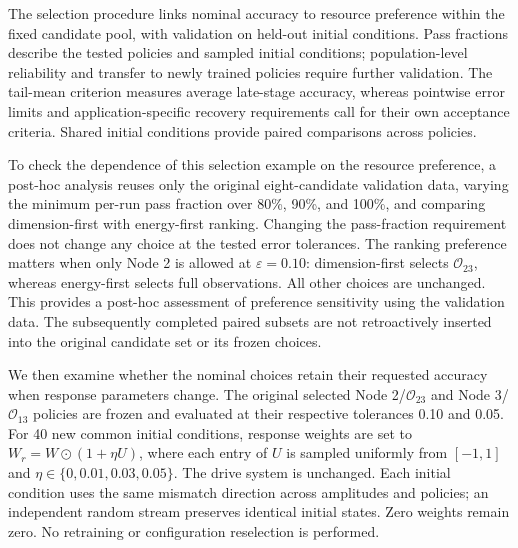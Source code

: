 \documentclass[a4paper,fleqn]{cas-sc}
\theoremstyle{plain}
\theoremstyle{definition}
\begin{document}
The selection procedure links nominal accuracy to resource preference within the fixed candidate pool, with validation on held-out initial conditions. Pass fractions describe the tested policies and sampled initial conditions; population-level reliability and transfer to newly trained policies require further validation. The tail-mean criterion measures average late-stage accuracy, whereas pointwise error limits and application-specific recovery requirements call for their own acceptance criteria. Shared initial conditions provide paired comparisons across policies.

To check the dependence of this selection example on the resource preference, a post-hoc analysis reuses only the original eight-candidate validation data, varying the minimum per-run pass fraction over 80\%, 90\%, and 100\%, and comparing dimension-first with energy-first ranking. Changing the pass-fraction requirement does not change any choice at the tested error tolerances. The ranking preference matters when only Node 2 is allowed at $\varepsilon=0.10$: dimension-first selects $\mathcal O_{23}$, whereas energy-first selects full observations. All other choices are unchanged. This provides a post-hoc assessment of preference sensitivity using the validation data. The subsequently completed paired subsets are not retroactively inserted into the original candidate set or its frozen choices.

We then examine whether the nominal choices retain their requested accuracy when response parameters change. The original selected Node 2/$\mathcal O_{23}$ and Node 3/$\mathcal O_{13}$ policies are frozen and evaluated at their respective tolerances 0.10 and 0.05. For 40 new common initial conditions, response weights are set to $W_r=W\odot(1+\eta U)$, where each entry of $U$ is sampled uniformly from $[-1,1]$ and $\eta\in\{0,0.01,0.03,0.05\}$. The drive system is unchanged. Each initial condition uses the same mismatch direction across amplitudes and policies; an independent random stream preserves identical initial states. Zero weights remain zero. No retraining or configuration reselection is performed.
\end{document}
